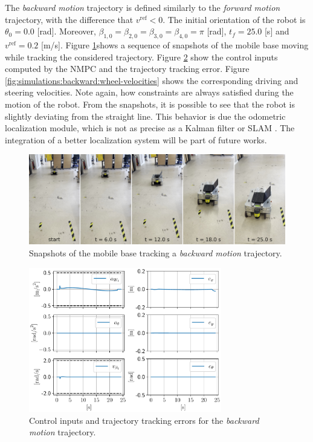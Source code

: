 The \textit{backward motion} trajectory is defined similarly to the
\textit{forward motion} trajectory, with the difference that
$v^{\mathrm{ref}}<0$. The initial orientation of the robot is $\theta_0=0.0$ [rad].
Moreover, $\beta_{1,0}=\beta_{2,0}=\beta_{3,0}=\beta_{4,0}=\pi$ [rad], $t_f = 25.0$
[s] and $v^{\mathrm{ref}}=0.2$ [m/s].
Figure \ref{fig:experiments:backward:snapshots}shows a sequence of snapshots of
the mobile base moving while tracking the considered trajectory.
Figure \ref{fig:simulations:backward:inputs-and-errors} show the control inputs
computed by the NMPC and the trajectory tracking error.
Figure \ref{fig:simulations:backward:wheel-velocities} shows the corresponding
driving and steering velocities. Note again, how constraints are always satisfied
during the motion of the robot. From the snapshots, it is possible to see that 
the robot is slightly deviating from the straight line. This behavior is due the 
odometric localization module, which is not as precise as a Kalman filter or
SLAM \cite{Thrun2005ProbabilisticRobotics}.
The integration of a better localization system will be part of future works.
\begin{figure}
    \centering
    \includegraphics[width=\textwidth]{figures/SWMR/simulations/backward/snapshots.jpeg}
    \caption{Snapshots of the mobile base tracking a \textit{backward motion} trajectory.}
    \label{fig:experiments:backward:snapshots}
\end{figure}
\begin{figure}
    \centering
    \includegraphics[width=0.75\textwidth]{figures/SWMR/simulations/backward/inputs_and_errors.pdf}
    \caption{Control inputs and trajectory tracking errors for the \textit{backward motion} trajectory.}
    \label{fig:simulations:backward:inputs-and-errors}
\end{figure}
